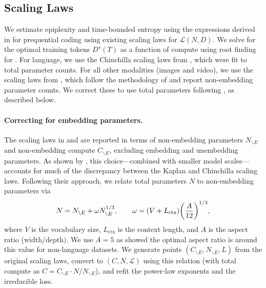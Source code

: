 \documentclass[twoside]{article}
\renewcommand{\L}{\mathcal{L}}
\renewcommand{\L}{\mathcal{L}}
\begin{document}
\subsection{Scaling Laws}\label{app:scaling-law-exps}
We estimate epiplexity and time-bounded entropy using the expressions derived in  for prequential coding using existing scaling laws for $\L(N,D)$. We solve for the optimal training tokens $D^\star(T)$ as a function of compute using root finding for . For language, we use the Chinchilla scaling laws from \citet{hoffmann2022training}, which were fit to total parameter counts. For all other modalities (images and video), we use the scaling laws from \citet{henighan2020scaling}, which follow the methodology of \citet{kaplan2020scaling} and report non-embedding parameter counts. We correct these to use total parameters following \citet{pearce2024reconciling}, as described below.

\paragraph{Correcting for embedding parameters.}
The scaling laws in \citet{kaplan2020scaling} and \citet{henighan2020scaling} are reported in terms of non-embedding parameters $N_{\backslash E}$ and non-embedding compute $C_{\backslash E}$, excluding embedding and unembedding parameters. As shown by \citet{pearce2024reconciling}, this choice---combined with smaller model scales---accounts for much of the discrepancy between the Kaplan and Chinchilla scaling laws. Following their approach, we relate total parameters $N$ to non-embedding parameters via
\begin{align}
    N = N_{\backslash E} + \omega N_{\backslash E}^{1/3}, \qquad \omega = (V + L_{\mathrm{ctx}}) \qty(\frac{A}{12})^{1/3},
\end{align}
where $V$ is the vocabulary size, $L_{\mathrm{ctx}}$ is the context length, and $A$ is the aspect ratio ($\mathrm{width} / \mathrm{depth})$. We use $A=5$ as \citet{henighan2020scaling} showed the optimal aspect ratio is around this value for non-language datasets. We generate points $(C_{\backslash E}, N_{\backslash E}, L)$ from the original scaling laws, convert to $(C, N, \L)$ using this relation (with total compute as $C = C_{\backslash E} \cdot N / N_{\backslash E}$), and refit the power-law exponents and the irreducible loss.
\end{document}
